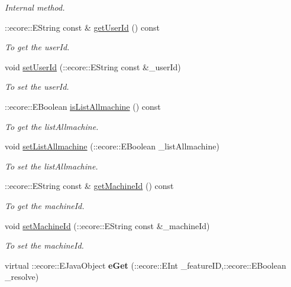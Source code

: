 \begin{DoxyCompactItemize}
\begin{DoxyCompactList}\small\item\em Internal method. \item\end{DoxyCompactList}\item 
::ecore::EString const \& \hyperlink{classUMS__Data_1_1ListMachineOptions_a0f7b20ce8eeed842f6bbb0e9aeec22b6}{getUserId} () const 
\begin{DoxyCompactList}\small\item\em To get the userId. \item\end{DoxyCompactList}\item 
void \hyperlink{classUMS__Data_1_1ListMachineOptions_ad399cfed3df4373cedc840987b0c650b}{setUserId} (::ecore::EString const \&\_\-userId)
\begin{DoxyCompactList}\small\item\em To set the userId. \item\end{DoxyCompactList}\item 
::ecore::EBoolean \hyperlink{classUMS__Data_1_1ListMachineOptions_afbba280c3dd1841a70309b472a48b2e5}{isListAllmachine} () const 
\begin{DoxyCompactList}\small\item\em To get the listAllmachine. \item\end{DoxyCompactList}\item 
void \hyperlink{classUMS__Data_1_1ListMachineOptions_ae404116130c3a0dd4e9e9a6969724cb9}{setListAllmachine} (::ecore::EBoolean \_\-listAllmachine)
\begin{DoxyCompactList}\small\item\em To set the listAllmachine. \item\end{DoxyCompactList}\item 
::ecore::EString const \& \hyperlink{classUMS__Data_1_1ListMachineOptions_a0427a2a3917e1a5765abd23d2553681c}{getMachineId} () const 
\begin{DoxyCompactList}\small\item\em To get the machineId. \item\end{DoxyCompactList}\item 
void \hyperlink{classUMS__Data_1_1ListMachineOptions_a6639e916f38397946e03c6f57c8c77b0}{setMachineId} (::ecore::EString const \&\_\-machineId)
\begin{DoxyCompactList}\small\item\em To set the machineId. \item\end{DoxyCompactList}\item 
\hypertarget{classUMS__Data_1_1ListMachineOptions_a3f336258746fddd1548f9c44be6b7421}{
virtual ::ecore::EJavaObject {\bfseries eGet} (::ecore::EInt \_\-featureID,::ecore::EBoolean \_\-resolve)}
\label{classUMS__Data_1_1ListMachineOptions_a3f336258746fddd1548f9c44be6b7421}


\end{DoxyCompactItemize}
